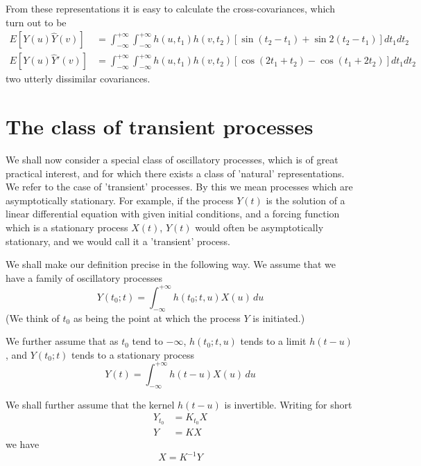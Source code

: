 \documentclass{article}
\begin{document}
From these representations it is easy to calculate the cross-covariances, which turn out to be
\begin{align}
E[Y(u)\hat{Y}(v)] &= \int_{-\infty}^{+\infty} \int_{-\infty}^{+\infty} h(u, t_1) h(v, t_2) \left[\sin(t_2 - t_1) + \sin 2(t_2 - t_1)\right] dt_1 dt_2 \label{eq:cov1} \\
E[Y(u)\hat{Y}'(v)] &= \int_{-\infty}^{+\infty} \int_{-\infty}^{+\infty} h(u, t_1) h(v, t_2) \left[\cos(2 t_1 + t_2) - \cos(t_1 + 2 t_2)\right] dt_1 dt_2 \label{eq:cov2}
\end{align}
two utterly dissimilar covariances.

\section*{The class of transient processes}

We shall now consider a special class of oscillatory processes, which is of great practical interest, and for which there exists a class of 'natural' representations. We refer to the case of 'transient' processes. By this we mean processes which are asymptotically stationary. For example, if the process $Y(t)$ is the solution of a linear differential equation with given initial conditions, and a forcing function which is a stationary process $X(t)$, $Y(t)$ would often be asymptotically stationary, and we would call it a 'transient' process.

We shall make our definition precise in the following way. We assume that we have a family of oscillatory processes
\begin{equation}
Y(t_0; t) = \int_{-\infty}^{+\infty} h(t_0; t, u) X(u)\, du
\label{eq:Yt0t}
\end{equation}
(We think of $t_0$ as being the point at which the process $Y$ is initiated.)

We further assume that as $t_0$ tend to $-\infty$, $h(t_0; t, u)$ tends to a limit $h(t-u)$, and $Y(t_0; t)$ tends to a stationary process
\begin{equation}
Y(t) = \int_{-\infty}^{+\infty} h(t-u) X(u)\, du
\label{eq:Ystationary}
\end{equation}

We shall further assume that the kernel $h(t-u)$ is invertible. Writing for short
\begin{align}
Y_{t_0} &= K_{t_0} X \label{eq:Yt0K} \\
Y &= K X \label{eq:YK}
\end{align}
we have
\begin{equation}
X = K^{-1} Y
\label{eq:XfromY}
\end{equation}
\end{document}
